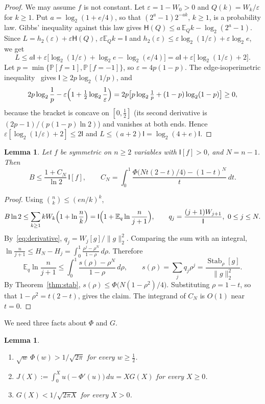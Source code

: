 \documentclass[11pt]{amsart}
\newtheorem{lemma}[theorem]{Lemma}
\theoremstyle{definition}
\theoremstyle{remark}
\newcommand{\E}{\mathbb E}
\renewcommand{\P}{\mathbb P}
\newcommand{\HH}{\mathsf H}
\newcommand{\I}{\mathsf I}
\newcommand{\eps}{\varepsilon}
\DeclareMathOperator{\Stab}{Stab}
\begin{document}
\begin{proof}
We may assume $f$ is not constant. Let $\eps=1-W_0>0$ and $Q(k)=W_k/\eps$ for $k\ge1$. Put $a=\log_2(1+e/4)$, so that $(2^a-1)2^{-ak}$, $k\ge1$, is a probability law. Gibbs' inequality against this law gives $\HH(Q)\le a\,\E_Qk-\log_2(2^a-1)$. Since $L=h_2(\eps)+\eps\HH(Q)$, $\eps\E_Qk=\I$ and $h_2(\eps)\le\eps\log_2(1/\eps)+\eps\log_2e$, we get
\[
 L\le a\I+\eps\bigl[\log_2(1/\eps)+\log_2e-\log_2(e/4)\bigr]=a\I+\eps\bigl[\log_2(1/\eps)+2\bigr].
\]
Let $p=\min\{\P[f=1],\P[f=-1]\}$, so $\eps=4p(1-p)$. The edge-isoperimetric inequality~\cite[Chapter~2]{OD14} gives $\I\ge2p\log_2(1/p)$, and
\[
 2p\log_2\frac1p-\eps\Bigl(1+\tfrac12\log_2\frac1\eps\Bigr)=2p\bigl[p\log_2\tfrac1p+(1-p)\log_2(1-p)\bigr]\ge0,
\]
because the bracket is concave on $[0,\tfrac12]$ (its second derivative is $(2p-1)/(p(1-p)\ln2)$) and vanishes at both ends. Hence $\eps[\log_2(1/\eps)+2]\le2\I$ and $L\le(a+2)\I=\log_2(4+e)\I$.
\end{proof}

\begin{lemma}\label{lem:reduction}
Let $f$ be symmetric on $n\ge2$ variables with $\I[f]>0$, and $N=n-1$. Then
\[
 B\le\frac{1+C_N}{\ln2}\,\I[f],\qquad
 C_N=\int_0^1\frac{\Phi\bigl(Nt(2-t)/4\bigr)-(1-t)^N}{t}\,dt.
\]
\end{lemma}

\begin{proof}
Using $\binom nk\le(en/k)^k$,
\[
 B\ln2\le\sum_{k\ge1}kW_k\Bigl(1+\ln\frac nk\Bigr)=\I\Bigl(1+\E_q\ln\frac n{j+1}\Bigr),\qquad q_j=\frac{(j+1)W_{j+1}}{\I},\ 0\le j\le N.
\]
By~\eqref{eq:derivative}, $q_j=W_j[g]/\|g\|_2^2$. Comparing the sum with an integral, $\ln\frac{n}{j+1}\le H_N-H_j=\int_0^1\frac{\rho^j-\rho^N}{1-\rho}\,d\rho$. Therefore
\[
 \E_q\ln\frac n{j+1}\le\int_0^1\frac{s(\rho)-\rho^N}{1-\rho}\,d\rho,\qquad s(\rho)=\sum_jq_j\rho^j=\frac{\Stab_\rho[g]}{\|g\|_2^2}.
\]
By Theorem~\ref{thm:stab}, $s(\rho)\le\Phi\bigl(N(1-\rho^2)/4\bigr)$. Substituting $\rho=1-t$, so that $1-\rho^2=t(2-t)$, gives the claim. The integrand of $C_N$ is $O(1)$ near $t=0$.
\end{proof}

We need three facts about $\Phi$ and $G$.

\begin{lemma}\label{lem:bessel}
\begin{enumerate}[label=\textup{(\roman*)}]
\item $\sqrt w\,\Phi(w)>1/\sqrt{2\pi}$ for every $w\ge\tfrac12$.
\item $J(X):=\int_0^Xu\,\bigl(-\Phi'(u)\bigr)\,du=XG(X)$ for every $X\ge0$.
\item $G(X)<1/\sqrt{2\pi X}$ for every $X>0$.
\end{enumerate}
\end{lemma}
\end{document}
